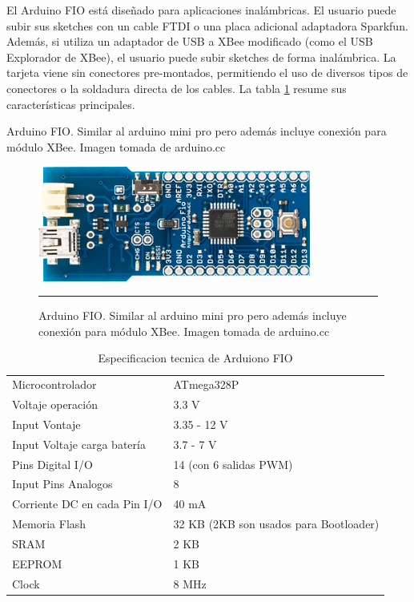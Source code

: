 El Arduino FIO está diseñado para aplicaciones inalámbricas. El usuario puede subir sus sketches con un cable FTDI o una placa adicional adaptadora Sparkfun. Además, si utiliza un adaptador de USB a XBee modificado (como el USB Explorador de XBee), el usuario puede subir sketches de forma inalámbrica. La tarjeta viene sin conectores pre-montados, permitiendo el uso de diversos tipos de conectores o la soldadura directa de los cables. La tabla \ref{table:Especificaciones Fio} resume sus características principales.

Arduino FIO. Similar al arduino mini pro pero además incluye conexión para módulo XBee. Imagen tomada de arduino.cc


\begin{figure}[htbp]
	\centering
		\includegraphics[width=0.8\textwidth]{./Figures/MODI/fio.jpg}
		\rule{35em}{0.5pt}
	\caption[fio]{Arduino FIO. Similar al arduino mini pro pero además incluye conexión para módulo XBee. Imagen tomada de arduino.cc}
	\label{fig:fio}
\end{figure}

\begin{table}
    \begin{tabular}{l|l}
    Microcontrolador             & ATmega328P                             \\
    Voltaje operación            & 3.3 V                                  \\
    Input Vontaje                & 3.35 - 12 V                            \\
    Input Voltaje carga batería  & 3.7 - 7 V                              \\
    Pins Digital I/O             & 14 (con 6  salidas PWM)                \\
    Input Pins Analogos          & 8                                      \\
    Corriente DC en cada Pin I/O & 40 mA                                  \\
    Memoria Flash                & 32 KB (2KB son usados para Bootloader) \\
    SRAM                         & 2 KB                                   \\
    EEPROM                       & 1 KB                                   \\
    Clock                        & 8 MHz                                  \\
    \end{tabular}
    \caption[Especificaciones Fio]{Especificacion tecnica de Arduiono FIO}
	\label{table:Especificaciones Fio}
\end{table}


